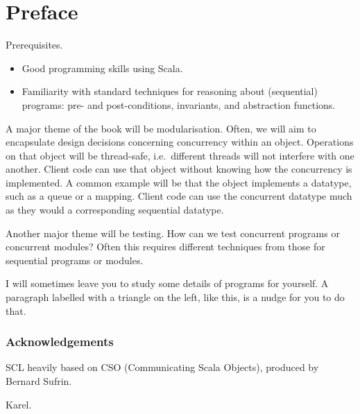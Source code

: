\chapter*{Preface}



Prerequisites.
%
\begin{itemize}
\item Good programming skills using Scala. 


\item Familiarity with standard techniques for reasoning about (sequential)
programs:  pre- and post-conditions, invariants, and abstraction functions.
\end{itemize}

A major theme of the book will be modularisation.  Often, we will aim to
encapsulate design decisions concerning concurrency within an object.
Operations on that object will be thread-safe, i.e.~different threads will not
interfere with one another.  Client code can use that object without knowing
how the concurrency is implemented.  A common example will be that the object
implements a datatype, such as a queue or a mapping.  Client code can use the
concurrent datatype much as they would a corresponding sequential datatype. 

Another major theme will be testing.  How can we test concurrent programs or
concurrent modules?  Often this requires different techniques from those for
sequential programs or modules. 


\begin{instruction}
I will sometimes leave you to study some details of programs for yourself.  A
paragraph labelled with a triangle on the left, like this, is a nudge for you
to do that.
\end{instruction}


\subsection*{Acknowledgements}



SCL heavily based on CSO (Communicating Scala Objects), produced by Bernard
Sufrin.

Karel.
